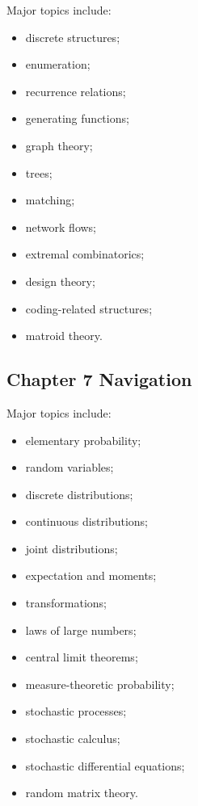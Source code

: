 Major topics include:

\begin{itemize}
    \item discrete structures;
    \item enumeration;
    \item recurrence relations;
    \item generating functions;
    \item graph theory;
    \item trees;
    \item matching;
    \item network flows;
    \item extremal combinatorics;
    \item design theory;
    \item coding-related structures;
    \item matroid theory.
\end{itemize}

\subsection{Chapter 7 Navigation}
\label{subsec:index-chapter-seven}

Major topics include:

\begin{itemize}
    \item elementary probability;
    \item random variables;
    \item discrete distributions;
    \item continuous distributions;
    \item joint distributions;
    \item expectation and moments;
    \item transformations;
    \item laws of large numbers;
    \item central limit theorems;
    \item measure-theoretic probability;
    \item stochastic processes;
    \item stochastic calculus;
    \item stochastic differential equations;
    \item random matrix theory.
\end{itemize}


